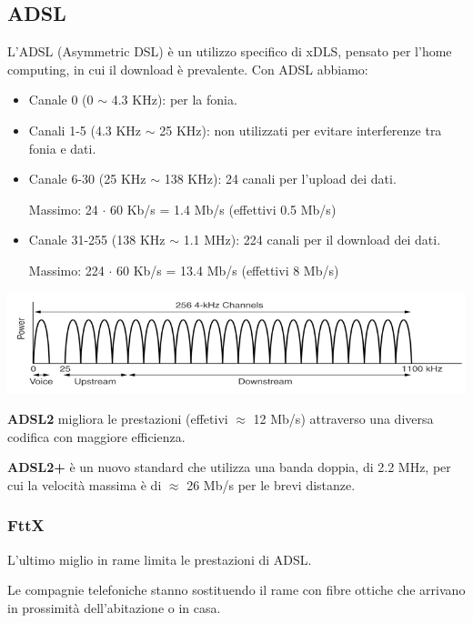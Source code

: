     \subsection{ADSL}
        L'ADSL (Asymmetric DSL) è un utilizzo specifico di xDLS, pensato per l'home computing, in cui il download è prevalente. Con ADSL abbiamo:
        \begin{itemize}
            \item Canale 0 (0 $\sim$ 4.3 KHz): per la fonia.
            \item Canali 1-5 (4.3 KHz $\sim$ 25 KHz): non utilizzati per evitare interferenze tra fonia e dati.
            \item Canale 6-30 (25 KHz $\sim$ 138 KHz): 24 canali per l'upload dei dati.
            
            Massimo: 24 $\cdot$ 60 Kb/s = 1.4 Mb/s (effettivi 0.5 Mb/s)
            \item Canale 31-255 (138 KHz $\sim$ 1.1 MHz): 224 canali per il download dei dati.
            
            Massimo: 224 $\cdot$ 60 Kb/s = 13.4 Mb/s (effettivi 8 Mb/s)
        \end{itemize}

        \begin{center}
            \includegraphics[scale=0.427]{chapters/2/assets/schema_f.png}
        \end{center}

        \textbf{ADSL2} migliora le prestazioni (effetivi $\approx$ 12 Mb/s) attraverso una diversa codifica con maggiore efficienza.

        \textbf{ADSL2+} è un nuovo standard che utilizza una banda doppia, di 2.2 MHz, per cui la velocità massima è di $\approx$ 26 Mb/s per le brevi distanze.

        \subsubsection{FttX}
            L'ultimo miglio in rame limita le prestazioni di ADSL.

            Le compagnie telefoniche stanno sostituendo il rame con fibre ottiche che arrivano in prossimità dell'abitazione o in casa.


